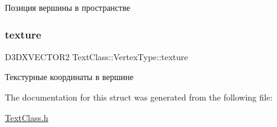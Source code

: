 Позиция вершины в пространстве 

\mbox{\label{struct_text_class_1_1_vertex_type_aa83b5963fa9226034bfda27b2b37766b}} 
\subsubsection{\texorpdfstring{texture}{texture}}
{\footnotesize\ttfamily D3\+D\+X\+V\+E\+C\+T\+O\+R2 Text\+Class\+::\+Vertex\+Type\+::texture}



Текстурные координаты в вершине 



The documentation for this struct was generated from the following file\+:\begin{DoxyCompactItemize}
\item 
\hyperlink{_text_class_8h}{Text\+Class.\+h}\end{DoxyCompactItemize}
